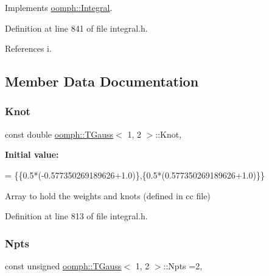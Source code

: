 Implements \hyperlink{classoomph_1_1Integral_ac65335e2aab120b285b3d6c294507b06}{oomph\+::\+Integral}.



Definition at line 841 of file integral.\+h.



References i.



\subsection{Member Data Documentation}
\mbox{\label{classoomph_1_1TGauss_3_011_00_012_01_4_a53a61e7a0c771e97f139cf2e17831454}} 
\subsubsection{\texorpdfstring{Knot}{Knot}}
{\footnotesize\ttfamily const double \hyperlink{classoomph_1_1TGauss}{oomph\+::\+T\+Gauss}$<$ 1, 2 $>$\+::Knot\hspace{0.3cm}{\ttfamily [static]}, {\ttfamily [private]}}

{\bfseries Initial value\+:}
\begin{DoxyCode}
=
\{\{0.5*(-0.577350269189626+1.0)\},\{0.5*(0.577350269189626+1.0)\}\}
\end{DoxyCode}


Array to hold the weights and knots (defined in cc file) 



Definition at line 813 of file integral.\+h.

\mbox{\label{classoomph_1_1TGauss_3_011_00_012_01_4_ae020377e678963b7dcc514903776fbcb}} 
\subsubsection{\texorpdfstring{Npts}{Npts}}
{\footnotesize\ttfamily const unsigned \hyperlink{classoomph_1_1TGauss}{oomph\+::\+T\+Gauss}$<$ 1, 2 $>$\+::Npts =2\hspace{0.3cm}{\ttfamily [static]}, {\ttfamily [private]}}



